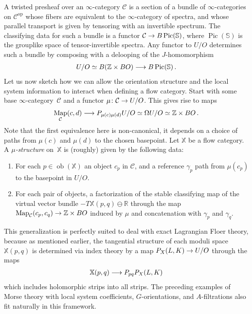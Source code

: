\documentclass[10pt]{amsart}
\numberwithin{equation}{section}
\theoremstyle{definition}
\DeclareMathOperator{\Map}{Map}
\DeclareMathOperator{\Pic}{Pic}
\DeclareMathOperator{\ob}{ob}
\DeclareMathOperator{\op}{op}
\newcommand{\bS}{\mathbb{S}}
\newcommand{\bZ}{\mathbb{Z}}
\newcommand{\bR}{\mathbb{R}}
\newcommand{\bX}{\mathbb{X}}
\newcommand{\cC}{\mathcal{C}}
\renewcommand{\to}{\mathchoice{\longrightarrow}{\rightarrow}{}{}}
\begin{document}
A twisted presheaf over an $\infty$-category $\cC$ is a section of a bundle of $\infty$-categories on $\cC^{\op}$ whose fibers are equivalent to the $\infty$-category of spectra, and whose parallel transport is given by tensoring with an invertible spectrum.
The classifying data for such a bundle is a functor $\cC \to B\Pic(\bS)$, where $\Pic(\bS)$ is the grouplike space of tensor-invertible spectra.
Any functor to $U/O$ determines such a bundle by composing with a delooping of the $J$-homomorphism
\begin{align*}
	U/O \simeq B(\bZ\times BO) \to B\Pic(\bS) \,.
\end{align*}
Let us now sketch how we can allow the orientation structure and the local system information to interact when defining a flow category.
Start with some base $\infty$-category~$\cC$ and a functor $\mu \colon \cC \to U/O$.
This gives rise to maps
\begin{align*}
	\Map_{\cC}(c,d) \to P_{\mu(c) \mu(d)} U/O \simeq \Omega U/O \simeq \bZ\times BO \,.
\end{align*}
Note that the first equivalence here is non-canonical, it depends on a choice of paths from $\mu(c)$ and $\mu(d)$ to the chosen basepoint.
Let $\bX$ be a flow category.
A \emph{$\mu$-structure} on~$\bX$ is (roughly) given by the following data:
\begin{enumerate}
	\item For each $p\in \ob(\bX)$ an object $c_{p}$ in $\cC$, and a reference $\gamma_{p}$ path from $\mu(c_{p})$ to the basepoint in $U/O$.
	\item For each pair of objects, a factorization of the stable classifying map of the virtual vector bundle $-T\bX(p,q) \ominus \bR$ through the map $\Map_{\cC}(c_{p},c_{q}) \to \bZ\times BO$ induced by $\mu$ and concatenation with $\gamma_{p}$ and $\gamma_{q}$.
\end{enumerate}
This generalization is perfectly suited to deal with exact Lagrangian Floer theory, because as mentioned earlier, the tangential structure of each moduli space $\bX(p,q)$ is determined via index theory by a map $P_{X}(L,K) \to U/O$ through the maps
\begin{align*}
	\bX(p,q) \to P_{pq} P_{X}(L,K)
\end{align*}
which includes holomorphic strips into all strips.
The preceding examples of Morse theory with local system coefficients, $G$-orientations, and $A$-filtrations also fit naturally in this framework.
\end{document}
